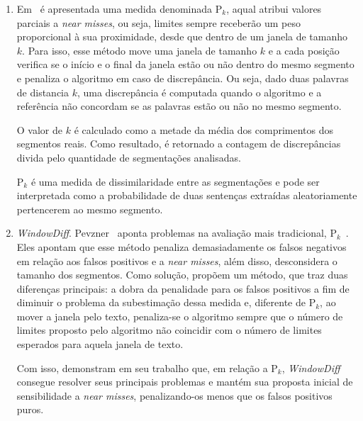\begin{enumerate}

	\item Em~\cite{Beeferman1999} é apresentada uma medida denominada P$_k$, aqual atribui valores parciais a \textit{near misses}, ou seja, limites sempre receberão um peso proporcional à sua proximidade, desde que dentro de um janela de tamanho~$k$.
%
Para isso, esse método move uma janela de tamanho $k$ e a cada posição verifica se o início e o final da janela estão ou não dentro do mesmo segmento e penaliza o algoritmo em caso de discrepância. Ou seja, dado duas palavras de distancia $k$, uma discrepância é computada quando o algoritmo e a referência não concordam se as palavras estão ou não no mesmo segmento.

O valor de $k$ é calculado como a metade da média dos comprimentos dos segmentos reais. Como resultado, é retornado a contagem de discrepâncias divida pelo quantidade de segmentações analisadas. 

P$_k$ é uma medida de dissimilaridade entre as segmentações e pode ser interpretada como a probabilidade de duas sentenças extraídas aleatoriamente pertencerem ao mesmo segmento.

\item \textit{WindowDiff}. Pevzner~\cite{Pevzner2002} aponta problemas na avaliação mais tradicional, P$_k$~\cite{Beeferman1999}. Eles apontam que esse método penaliza demasiadamente os falsos negativos em relação aos falsos positivos e a \textit{near misses}, além disso, desconsidera o tamanho dos segmentos. Como solução, propõem um método, que traz duas diferenças principais: a dobra da penalidade para os falsos positivos a fim de diminuir o problema da subestimação dessa medida e, diferente de P$_k$, ao mover a janela pelo texto, penaliza-se o algoritmo sempre que o número de limites proposto pelo algoritmo não coincidir com o número de limites esperados para aquela janela de texto. 

Com isso, demonstram em seu trabalho que, em relação a P$_k$, \textit{WindowDiff} consegue resolver seus principais problemas e mantém sua proposta inicial de sensibilidade a \textit{near misses}, penalizando-os menos que os falsos positivos puros.


\end{enumerate}











